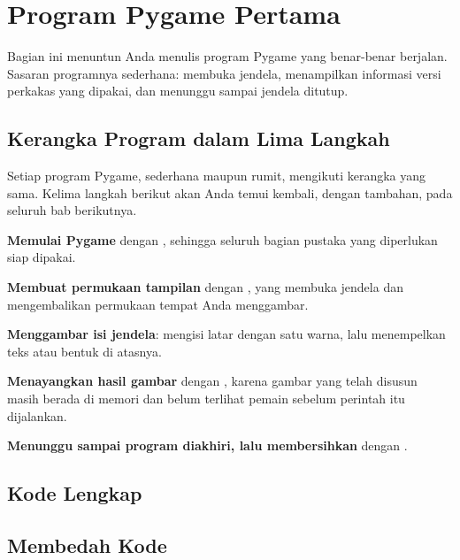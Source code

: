 \section{Program Pygame Pertama}
\label{sec:program-pertama}

Bagian ini menuntun Anda menulis program Pygame yang benar-benar berjalan.
Sasaran programnya sederhana: membuka jendela, menampilkan informasi versi
perkakas yang dipakai, dan menunggu sampai jendela ditutup.

\subsection{Kerangka Program dalam Lima Langkah}

Setiap program Pygame, sederhana maupun rumit, mengikuti kerangka yang sama.
Kelima langkah berikut akan Anda temui kembali, dengan tambahan, pada seluruh
bab berikutnya.

\begin{langkah}
  \item \textbf{Memulai Pygame} dengan , sehingga seluruh
        bagian pustaka yang diperlukan siap dipakai.
  \item \textbf{Membuat permukaan tampilan} dengan
        , yang membuka jendela dan
        mengembalikan permukaan tempat Anda menggambar.
  \item \textbf{Menggambar isi jendela}: mengisi latar dengan satu warna, lalu
        menempelkan teks atau bentuk di atasnya.
  \item \textbf{Menayangkan hasil gambar} dengan ,
        karena gambar yang telah disusun masih berada di memori dan belum
        terlihat pemain sebelum perintah itu dijalankan.
  \item \textbf{Menunggu sampai program diakhiri, lalu membersihkan} dengan
        .
\end{langkah}

\subsection{Kode Lengkap}


\subsection{Membedah Kode}

